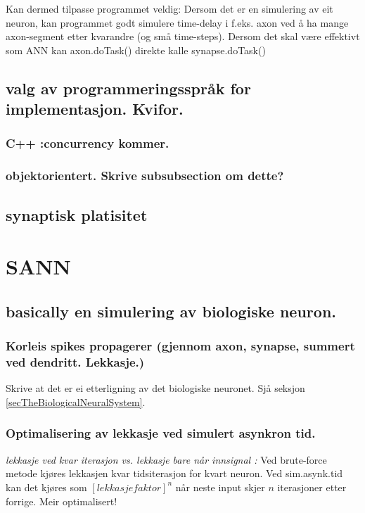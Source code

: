 			Kan dermed tilpasse programmet veldig: Dersom det er en simulering av eit neuron, kan programmet godt simulere time-delay i f.eks. axon ved å ha mange axon-segment etter kvarandre (og små time-steps).
			Dersom det skal være effektivt som ANN kan axon.doTask() direkte kalle synapse.doTask()


	\subsection{valg av programmeringsspråk for implementasjon. Kvifor.} %
		\subsubsection{C++ :concurrency kommer.} %
		\subsubsection{objektorientert. Skrive subsubsection om dette?}

	\subsection{synaptisk platisitet}








\section{SANN}
	\subsection{basically en simulering av biologiske neuron.}
		\subsubsection{Korleis spikes propagerer (gjennom axon, synapse, summert ved dendritt. Lekkasje.)}
		Skrive at det er ei etterligning av det biologiske neuronet. Sjå seksjon \ref{secTheBiologicalNeuralSystem}.

	\subsubsection{Optimalisering av lekkasje ved simulert asynkron tid.}
		\emph{lekkasje ved kvar iterasjon vs. lekkasje bare når innsignal :}
			Ved brute-force metode kjøres lekkasjen kvar tidsiterasjon for kvart neuron. Ved sim.asynk.tid kan det kjøres som $[lekkasjefaktor]^n$ når neste input skjer $n$ iterasjoner etter forrige. Meir optimalisert!

